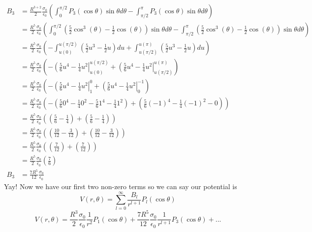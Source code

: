 \documentclass[11pt]{article}
\numberwithin{equation}{section}
\begin{document}
\begin{align*}
B_3 &= \frac{R^{3+2}}{2}\frac{\sigma_0}{\epsilon_0}\left(\int_0^{\pi/2} P_{3}(\cos\theta)\sin\theta d\theta - \int_{\pi/2}^{\pi} P_{3}(\cos\theta)\sin\theta d\theta\right)\\
 &= \frac{R^{5}}{2}\frac{\sigma_0}{\epsilon_0}\left(\int_0^{\pi/2} \left(\frac{5}{2}\cos^3(\theta)-\frac{1}{2}\cos(\theta)\right)\sin\theta d\theta - \int_{\pi/2}^{\pi} \left(\frac{5}{2}\cos^3(\theta)-\frac{1}{2}\cos(\theta)\right)\sin\theta d\theta\right)\\
 &= \frac{R^{5}}{2}\frac{\sigma_0}{\epsilon_0}\left(-\int_{u(0)}^{u(\pi/2)} \left(\frac{5}{2}u^3-\frac{1}{2}u\right)du + \int_{u(\pi/2)}^{u(\pi)} \left(\frac{5}{2}u^3-\frac{1}{2}u\right)du\right)\\
 &= \frac{R^{5}}{2}\frac{\sigma_0}{\epsilon_0}\left(-\left(\frac{5}{6}u^4-\frac{1}{4}u^2\right|_{u(0)}^{u(\pi/2)} + \left(\frac{5}{6}u^4-\frac{1}{4}u^2\right|_{u(\pi/2)}^{u(\pi)} \right)\\
 &= \frac{R^{5}}{2}\frac{\sigma_0}{\epsilon_0}\left(-\left(\frac{5}{6}u^4-\frac{1}{4}u^2\right|_{1}^{0} + \left(\frac{5}{6}u^4-\frac{1}{4}u^2\right|_{0}^{-1} \right)\\
 &= \frac{R^{5}}{2}\frac{\sigma_0}{\epsilon_0}\left(-\left(\frac{5}{6}0^4-\frac{1}{4}0^2-\frac{5}{6}1^4-\frac{1}{4}1^2\right) + \left(\frac{5}{6}(-1)^4-\frac{1}{4}(-1)^2-0\right) \right)\\
 &= \frac{R^{5}}{2}\frac{\sigma_0}{\epsilon_0}\left(\left(\frac{5}{6}-\frac{1}{4}\right) + \left(\frac{5}{6}-\frac{1}{4}\right)\right)\\
 &= \frac{R^{5}}{2}\frac{\sigma_0}{\epsilon_0}\left(\left(\frac{10}{12}-\frac{3}{12}\right) + \left(\frac{10}{12}-\frac{3}{12}\right)\right)\\
 &= \frac{R^{5}}{2}\frac{\sigma_0}{\epsilon_0}\left(\left(\frac{7}{12}\right) + \left(\frac{7}{12}\right)\right)\\
 &= \frac{R^{5}}{2}\frac{\sigma_0}{\epsilon_0}\left(\frac{7}{6}\right)\\
B_3 &= \frac{7R^{5}}{12}\frac{\sigma_0}{\epsilon_0}
\end{align*}
Yay! Now we have our first two non-zero terms so we can say our potential is
$$V(r,\theta) = \sum_{l=0}^{\infty}\frac{B_l}{r^{l+1}}P_l(\cos\theta)$$
$$V(r,\theta) = \frac{R^{3}}{2}\frac{\sigma_0}{\epsilon_0}\frac{1}{r^{2}}P_1(\cos\theta) + \frac{7R^{5}}{12}\frac{\sigma_0}{\epsilon_0}\frac{1}{r^{l+1}}P_3(\cos\theta)+...$$
\end{document}

